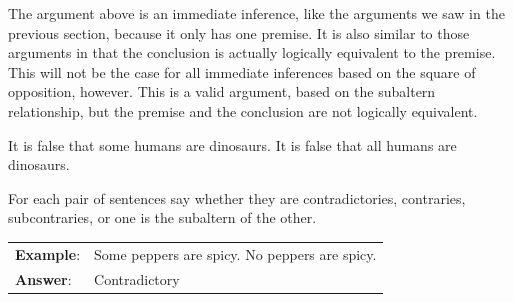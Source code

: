The argument above is an immediate inference, like the arguments we saw in the previous section, because it only has one premise. It is also similar to those arguments in that the conclusion is actually logically equivalent to the premise. This will not be the case for all immediate inferences based on the square of opposition, however. This is a valid argument, based on the subaltern relationship, but the premise and the conclusion are not logically equivalent. 

\begin{earg*}
\item It is false that some humans are dinosaurs.
\itemc[.45]  It is false that all humans are dinosaurs.
\end{earg*}


\practiceproblems
\noindent \problempart For each pair of sentences say whether they are contradictories, contraries, subcontraries, or one is the subaltern of the other. 

\begin{longtabu}{p{.1\linewidth}p{.9\linewidth}}
\textbf{Example}: & Some peppers are spicy. \newline No peppers are spicy. \\
\textbf{Answer}: &Contradictory\\
\end{longtabu}

